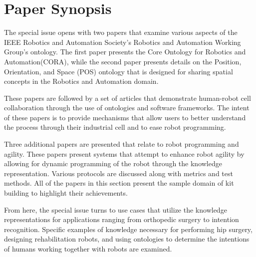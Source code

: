 \section{Paper Synopsis}
The special issue opens with two papers that examine various aspects of the IEEE Robotics 
and Automation Society's Robotics and Automation Working Group's ontology. The first paper
presents the Core Ontology for Robotics and Automation(CORA), while the second paper presents
details on the Position, Orientation, and Space (POS) ontology that is designed for sharing spatial concepts in the Robotics 
and Automation domain.

These papers are followed by a set of articles that demonstrate human-robot cell collaboration
through the use of ontologies and software frameworks. The  intent of these papers is to 
provide mechanisms that allow users to better understand the process through their industrial
cell and to ease robot programming.

Three additional papers are presented that relate to robot programming and agility. These
papers present systems that attempt to enhance robot agility by allowing for dynamic
programming of the robot through the knowledge representation. Various protocols are
discussed along with metrics and test methods.  All of the papers in this section present
the sample domain of kit building to highlight their achievements.

From here, the special issue turns to use cases that utilize the knowledge representations for 
applications ranging from orthopedic surgery to intention recognition. Specific examples
of knowledge necessary for performing hip surgery, designing rehabilitation robots, and
using ontologies to determine the intentions of humans working together with robots
are examined.
